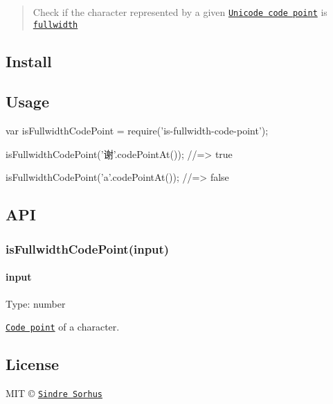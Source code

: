 \begin{quote}
Check if the character represented by a given \href{https://en.wikipedia.org/wiki/Code_point}{\tt Unicode code point} is \href{https://en.wikipedia.org/wiki/Halfwidth_and_fullwidth_forms}{\tt fullwidth} \end{quote}


\subsection*{Install}




\subsection*{Usage}


\begin{DoxyCode}
var isFullwidthCodePoint = require('is-fullwidth-code-point');

isFullwidthCodePoint('谢'.codePointAt());
//=> true

isFullwidthCodePoint('a'.codePointAt());
//=> false
\end{DoxyCode}


\subsection*{A\+PI}

\subsubsection*{is\+Fullwidth\+Code\+Point(input)}

\paragraph*{input}

Type\+: {\ttfamily number}

\href{https://en.wikipedia.org/wiki/Code_point}{\tt Code point} of a character.

\subsection*{License}

M\+IT © \href{http://sindresorhus.com}{\tt Sindre Sorhus} 